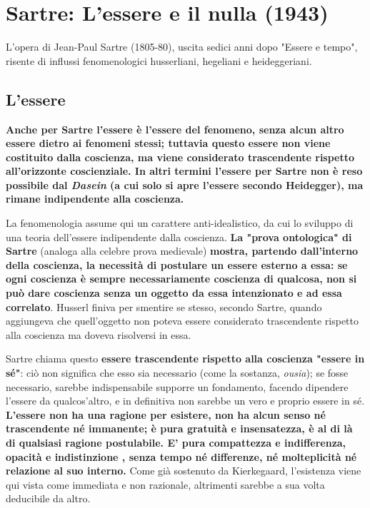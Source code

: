 \section{Sartre: L'essere e il nulla (1943)}


L'opera di  Jean-Paul Sartre (1805-80), uscita sedici anni dopo
"Essere e tempo", risente di influssi fenomenologici husserliani,
hegeliani e heideggeriani.

\subsection{L'essere}

\textbf{Anche per Sartre l'essere è l'essere del fenomeno,
senza alcun altro essere dietro ai fenomeni stessi;
tuttavia questo essere non viene costituito dalla
coscienza, ma viene considerato trascendente rispetto
all'orizzonte coscienziale. In altri termini
l'essere per Sartre non è reso possibile dal
\textit{Dasein} (a cui solo si apre l'essere secondo Heidegger),
ma rimane indipendente alla coscienza.}

La fenomenologia assume qui un carattere
anti-idealistico, da cui lo sviluppo di una teoria
dell'essere indipendente dalla coscienza.
\textbf{La "prova ontologica" di Sartre} (analoga alla
celebre prova medievale)\textbf{ mostra, partendo dall'interno
della coscienza, la necessità di postulare un
essere esterno a essa: se ogni coscienza è sempre
necessariamente coscienza di qualcosa,
non si può dare coscienza senza un oggetto da essa
intenzionato e ad essa correlato}. Husserl finiva
per smentire se stesso, secondo Sartre, quando
aggiungeva che quell'oggetto non poteva essere considerato trascendente rispetto alla coscienza ma doveva
risolversi in essa.

Sartre chiama questo \textbf{essere trascendente rispetto
alla coscienza "essere in sé"}: ciò non significa
che esso sia necessario (come la sostanza, \textit{ousia});
se fosse necessario, sarebbe indispensabile supporre
un fondamento, facendo dipendere l'essere da qualcos'altro, e in
definitiva non sarebbe un vero e proprio essere in sé.
\textbf{L'essere non ha una ragione per esistere, non
ha alcun senso né trascendente né immanente;
è pura gratuità e insensatezza, è al di là di
qualsiasi ragione postulabile. E' pura compattezza
e indifferenza, opacità e indistinzione , senza tempo
né differenze, né molteplicità né relazione al suo interno.}
Come già sostenuto da Kierkegaard, l'esistenza viene qui vista come immediata e non razionale, altrimenti sarebbe a sua volta deducibile da altro.


